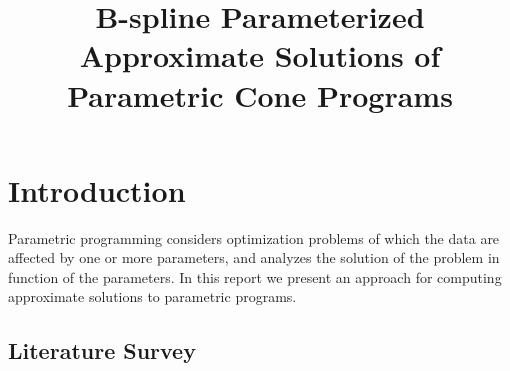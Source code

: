 \documentclass{article}
\begin{document}
\title{B-spline Parameterized Approximate Solutions of Parametric Cone Programs}%

\maketitle


\section{Introduction}

Parametric programming considers optimization problems of which the data are affected by one or more parameters, and analyzes the solution of the problem in function of the parameters. In this report we present an approach for computing approximate solutions to parametric programs.


\subsection{Literature Survey}
\end{document}
